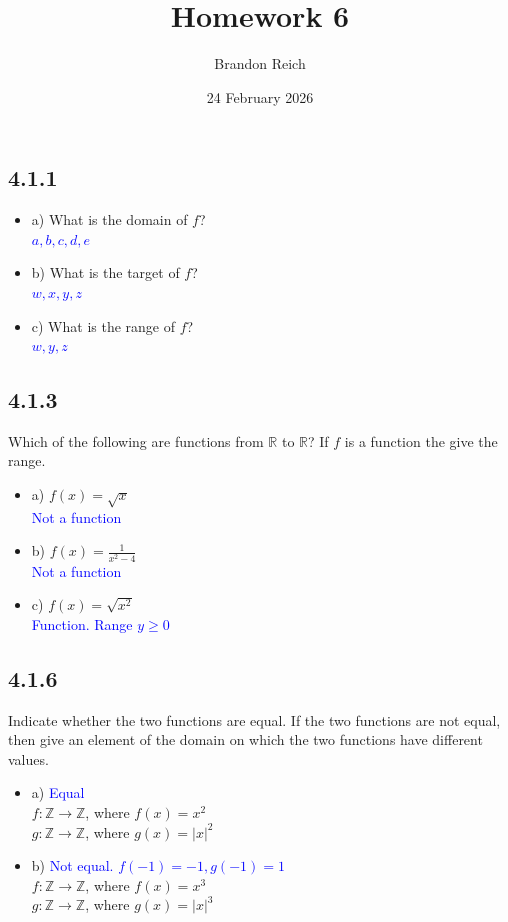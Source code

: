 \documentclass{article}
\title{Homework 6}
\author{Brandon Reich}
\date{24 February 2026}
\begin{document}
\maketitle

\subsection*{4.1.1}
\begin{itemize}
    \item a) What is the domain of $f$? \\
    \textcolor{blue}{$a,b,c,d,e$}
    \item b) What is the target of $f$? \\
    \textcolor{blue}{$w,x,y,z$}
    \item c) What is the range of $f$? \\
    \textcolor{blue}{$w,y,z$}
\end{itemize}

\subsection*{4.1.3}
Which of the following are functions from $\mathbb{R}$ to $\mathbb{R}$? If $f$ is a function the give the range.
\begin{itemize}
    \item a) $f(x) = \sqrt{x}$ \\
    \textcolor{blue}{Not a function}
    \item b) $f(x) = \frac{1}{x^2-4}$ \\
    \textcolor{blue}{Not a function}
    \item c) $f(x) = \sqrt{x^2}$ \\
    \textcolor{blue}{Function. Range $y \ge 0$}
\end{itemize}

\subsection*{4.1.6}
Indicate whether the two functions are equal. If the two functions are not equal, then give an element of the domain on which the two functions have different values.
\begin{itemize}
    \item a) \textcolor{blue}{Equal} \\
    $f: \mathbb{Z} \rightarrow \mathbb{Z}$, where $f(x) = x^2$ \\
    $g: \mathbb{Z} \rightarrow \mathbb{Z}$, where $g(x) = |x|^2$
    \item b) \textcolor{blue}{Not equal. $f(-1) = -1, g(-1) = 1$} \\
    $f: \mathbb{Z} \rightarrow \mathbb{Z}$, where $f(x) = x^3$ \\
    $g: \mathbb{Z} \rightarrow \mathbb{Z}$, where $g(x) = |x|^3$ 
\end{itemize}
\end{document}
